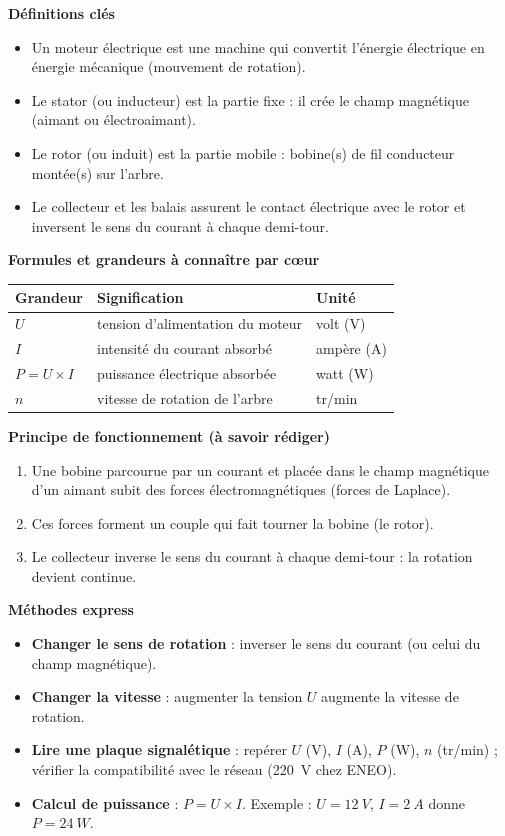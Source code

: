 \documentclass[11pt]{article}
\newcommand{\cle}[1]{{\popxbold\color{popdark}#1}}
\begin{document}
\begin{bilan}
\textbf{Définitions clés}
\begin{itemize}
\item Un \cle{moteur électrique} est une machine qui convertit l'\cle{énergie électrique} en \cle{énergie mécanique} (mouvement de rotation).
\item Le \cle{stator} (ou inducteur) est la partie fixe : il crée le champ magnétique (aimant ou électroaimant).
\item Le \cle{rotor} (ou induit) est la partie mobile : bobine(s) de fil conducteur montée(s) sur l'arbre.
\item Le \cle{collecteur} et les \cle{balais} assurent le contact électrique avec le rotor et inversent le sens du courant à chaque demi-tour.
\end{itemize}

\textbf{Formules et grandeurs à connaître par cœur}
\begin{center}
\begin{tabularx}{\linewidth}{|l|X|l|}\hline
\rowcolor{popblueL} \textbf{Grandeur} & \textbf{Signification} & \textbf{Unité} \\ \hline
$U$ & tension d'alimentation du moteur & volt (V) \\ \hline
$I$ & intensité du courant absorbé & ampère (A) \\ \hline
$P = U \times I$ & puissance électrique absorbée & watt (W) \\ \hline
$n$ & vitesse de rotation de l'arbre & tr/min \\ \hline
\end{tabularx}
\end{center}

\textbf{Principe de fonctionnement (à savoir rédiger)}
\begin{enumerate}
\item Une bobine parcourue par un courant et placée dans le champ magnétique d'un aimant subit des \cle{forces électromagnétiques} (forces de Laplace).
\item Ces forces forment un \cle{couple} qui fait tourner la bobine (le rotor).
\item Le collecteur inverse le sens du courant à chaque demi-tour : la rotation devient \cle{continue}.
\end{enumerate}

\textbf{Méthodes express}
\begin{itemize}
\item \textbf{Changer le sens de rotation} : inverser le sens du courant (ou celui du champ magnétique).
\item \textbf{Changer la vitesse} : augmenter la tension $U$ augmente la vitesse de rotation.
\item \textbf{Lire une plaque signalétique} : repérer $U$ (V), $I$ (A), $P$ (W), $n$ (tr/min) ; vérifier la compatibilité avec le réseau (\SI{220}{V} chez ENEO).
\item \textbf{Calcul de puissance} : $P = U \times I$. Exemple : $U = \SI{12}{V}$, $I = \SI{2}{A}$ donne $P = \SI{24}{W}$.
\end{itemize}
\end{bilan}
\end{document}
